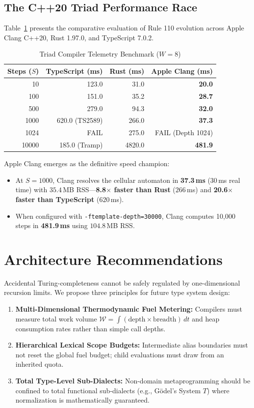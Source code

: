 \documentclass[10pt,journal,compsoc]{IEEEtran}
\begin{document}
\subsection{The C++20 Triad Performance Race}
Table~\ref{tab:triad_results} presents the comparative evaluation of Rule 110 evolution across Apple Clang C++20, Rust 1.97.0, and TypeScript 7.0.2.

\begin{table}[ht]
\centering
\caption{Triad Compiler Telemetry Benchmark ($W = 8$)}
\label{tab:triad_results}
\begin{tabular}{@{}rrrr@{}}
\toprule
\textbf{Steps ($S$)} & \textbf{TypeScript (ms)} & \textbf{Rust (ms)} & \textbf{Apple Clang (ms)} \\ \midrule
10 & 123.0 & 31.0 & \textbf{20.0} \\
100 & 151.0 & 35.2 & \textbf{28.7} \\
500 & 279.0 & 94.3 & \textbf{32.0} \\
1000 & 620.0 (TS2589) & 266.0 & \textbf{37.3} \\
1024 & FAIL & 275.0 & FAIL (Depth 1024) \\
10000 & 185.0 (Tramp) & 4820.0 & \textbf{481.9} \\ \bottomrule
\end{tabular}
\end{table}

Apple Clang emerges as the definitive speed champion:
\begin{itemize}
    \item At $S = 1000$, Clang resolves the cellular automaton in \textbf{37.3\,ms} (30\,ms real time) with $35.4$\,MB RSS—\textbf{8.8$\times$ faster than Rust} ($266$\,ms) and \textbf{20.6$\times$ faster than TypeScript} ($620$\,ms).
    \item When configured with \texttt{-ftemplate-depth=30000}, Clang computes 10,000 steps in \textbf{481.9\,ms} using $104.8$\,MB RSS.
\end{itemize}

\section{Architecture Recommendations}
Accidental Turing-completeness cannot be safely regulated by one-dimensional recursion limits. We propose three principles for future type system design:
\begin{enumerate}
    \item \textbf{Multi-Dimensional Thermodynamic Fuel Metering:} Compilers must measure total work volume $\mathcal{W} = \int (\text{depth} \times \text{breadth}) \, dt$ and heap consumption rates rather than simple call depths.
    \item \textbf{Hierarchical Lexical Scope Budgets:} Intermediate alias boundaries must not reset the global fuel budget; child evaluations must draw from an inherited quota.
    \item \textbf{Total Type-Level Sub-Dialects:} Non-domain metaprogramming should be confined to total functional sub-dialects (e.g., G\"odel's System $T$) where normalization is mathematically guaranteed.
\end{enumerate}
\end{document}
